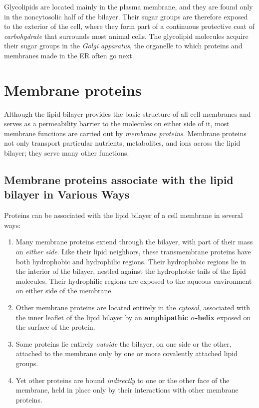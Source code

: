 Glycolipids are located mainly in the plasma membrane, and they are
found only in the noncytosolic half of the bilayer. Their sugar groups are
therefore exposed to the exterior of the cell, where they
form part of a continuous protective coat of \textit{carbohydrate} that surrounds
most animal cells. The glycolipid molecules acquire their sugar groups
in the \textit{Golgi apparatus}, the organelle to which proteins and membranes
made in the ER often go next.

\section{Membrane proteins}

Although the lipid bilayer provides the basic structure of all cell membranes
and serves as a permeability barrier to the molecules on either
side of it, most membrane functions are carried out by \textit{membrane proteins}.
Membrane proteins not only transport particular nutrients, metabolites,
and ions across the lipid bilayer; they serve many other functions.

\subsection{Membrane proteins associate with the lipid bilayer in Various Ways}

Proteins can be associated with the lipid bilayer of a cell membrane in
several ways:

\begin{enumerate}
\item Many membrane proteins extend through the bilayer, with part of
their mass on \textit{either side}. Like their lipid neighbors,
these transmembrane proteins have both hydrophobic and
hydrophilic regions. Their hydrophobic regions lie in the interior
of the bilayer, nestled against the hydrophobic tails of the lipid
molecules. Their hydrophilic regions are exposed to the aqueous
environment on either side of the membrane.
\item Other membrane proteins are located entirely in the \textit{cytosol}, associated
with the inner leaflet of the lipid bilayer by an \textbf{amphipathic $\alpha$-helix} exposed on the surface of the protein.
\item Some proteins lie entirely \textit{outside} the bilayer, on one side or the
other, attached to the membrane only by one or more covalently
attached lipid groups.
\item Yet other proteins are bound \textit{indirectly} to one or the other face of
the membrane, held in place only by their interactions with other
membrane proteins.
\end{enumerate}

